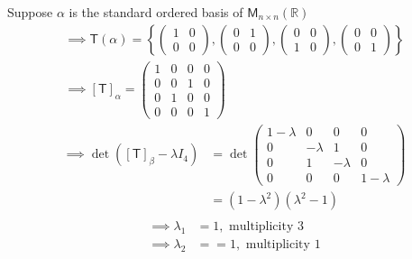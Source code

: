 \begin{enumerate}
Suppose $\alpha$ is the standard ordered basis of $\mathsf{M}_{n\times
  n}(\mathbb{R})$
\begin{gather}
\implies \mathsf{T}(\alpha) =\left\{\begin{pmatrix}1&0\\0 &
    0\end{pmatrix},\begin{pmatrix}0&1\\0& 0\end{pmatrix},\begin{pmatrix}0
    & 0 \\1&0\end{pmatrix},\begin{pmatrix}0& 0
    \\0&1\end{pmatrix}\right\}\\
\implies [\mathsf{T}]_\alpha = \begin{pmatrix}
1 & 0 & 0 & 0\\
0 & 0 & 1 & 0\\
0 & 1 & 0 & 0\\
0 & 0 & 0 & 1
\end{pmatrix}
\end{gather}
\begin{align}
\implies \det{([\mathsf{T}]_\beta-\lambda I_4)} &= \det{
\begin{pmatrix}
1-\lambda & 0 & 0 & 0\\
0 & -\lambda & 1 &  0\\
0 & 1 & -\lambda & 0\\
0 & 0 &0 & 1-\lambda
\end{pmatrix}
}\\
&=(1-\lambda^2)(\lambda^2-1)\\
\end{align}
\begin{align}
\implies \lambda_1 &= 1, \text{ multiplicity } 3\\
\implies \lambda_2 &= =1, \text{ multiplicity } 1
\end{align}
\end{enumerate}
